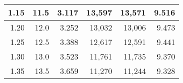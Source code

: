 \begin{longtable}{|r|r|r|r|r|r|}
			1.15                                                                                                   & 11.5                                                                                                  & 3.117                                                                                          & 13,597                                             & 13,571                                                    & 9.516                                             \\ \hline
			1.20                                                                                                   & 12.0                                                                                                  & 3.252                                                                                          & 13,032                                             & 13,006                                                    & 9.473                                             \\ \hline
			1.25                                                                                                   & 12.5                                                                                                  & 3.388                                                                                          & 12,617                                             & 12,591                                                    & 9.441                                             \\ \hline
			1.30                                                                                                   & 13.0                                                                                                  & 3.523                                                                                          & 11,761                                             & 11,735                                                    & 9.370                                             \\ \hline
			1.35                                                                                                   & 13.5                                                                                                  & 3.659                                                                                          & 11,270                                             & 11,244                                                    & 9.328                                             \\ \hline

\end{longtable}
